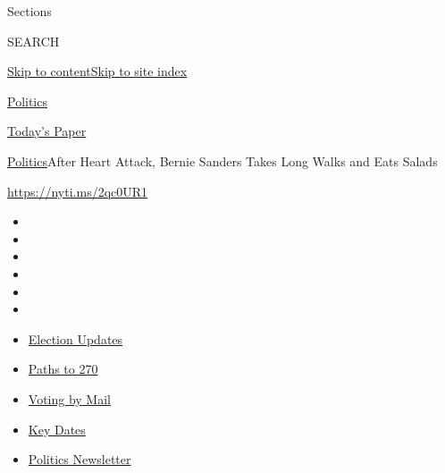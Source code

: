 Sections

SEARCH

\protect\hyperlink{site-content}{Skip to
content}\protect\hyperlink{site-index}{Skip to site index}

\href{https://www.nytimes3xbfgragh.onion/section/politics}{Politics}

\href{https://myaccount.nytimes3xbfgragh.onion/auth/login?response_type=cookie\&client_id=vi}{}

\href{https://www.nytimes3xbfgragh.onion/section/todayspaper}{Today's
Paper}

\href{/section/politics}{Politics}\textbar{}After Heart Attack, Bernie
Sanders Takes Long Walks and Eats Salads

\url{https://nyti.ms/2qc0UR1}

\begin{itemize}
\item
\item
\item
\item
\item
\item
\end{itemize}

\begin{itemize}
\item
  \href{https://www.nytimes3xbfgragh.onion/live/2020/09/07/us/trump-vs-biden?action=click\&pgtype=Article\&state=default\&region=TOP_BANNER\&context=storylines_menu}{Election
  Updates}
\item
  \href{https://www.nytimes3xbfgragh.onion/interactive/2020/us/elections/election-states-biden-trump.html?action=click\&pgtype=Article\&state=default\&region=TOP_BANNER\&context=storylines_menu}{Paths
  to 270}
\item
  \href{https://www.nytimes3xbfgragh.onion/interactive/2020/08/31/us/politics/vote-by-mail-deadlines.html?action=click\&pgtype=Article\&state=default\&region=TOP_BANNER\&context=storylines_menu}{Voting
  by Mail}
\item
  \href{https://www.nytimes3xbfgragh.onion/interactive/2019/us/elections/2020-presidential-election-calendar.html?action=click\&pgtype=Article\&state=default\&region=TOP_BANNER\&context=storylines_menu}{Key
  Dates}
\item
  \href{https://www.nytimes3xbfgragh.onion/newsletters/politics?action=click\&pgtype=Article\&state=default\&region=TOP_BANNER\&context=storylines_menu}{Politics
  Newsletter}
\end{itemize}

